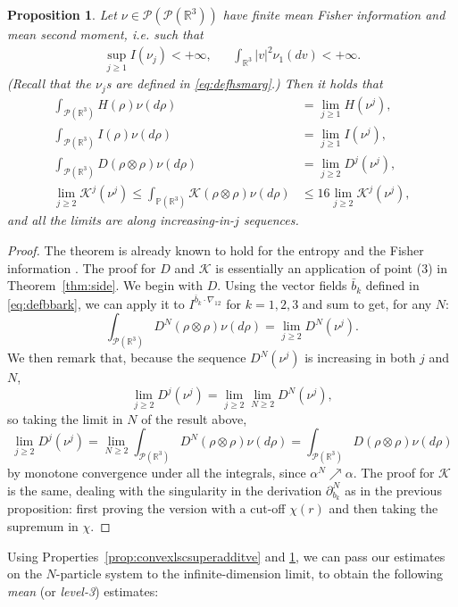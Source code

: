 \documentclass[11pt,a4paper]{article}
\theoremstyle{definition}
\theoremstyle{plain}
\newtheorem{prop}[defi]{Proposition}
\begin{document}
\begin{prop}
    \label{thm:level3affinity}
    Let $\nu\in \mathcal{P}(\mathcal{P}(\mathbb{R}^3))$ have finite mean Fisher information and mean second moment, \textit{i.e.} such that
    \begin{align*}
        \sup_{j\geq 1} I(\nu_j) < +\infty,&&\int_{\mathbb{R}^3} \vert v \vert^2 \nu_1(dv) < +\infty.
    \end{align*}
    (Recall that the $\nu_j$s are defined in \eqref{eq:defhsmarg}.) Then it holds that
    \begin{align*}
        \int_{\mathcal{P}(\mathbb{R}^3)} H(\rho) \nu(d\rho) &=\lim_{j\geq 1} H(\nu^j),\\
        \int_{\mathcal{P}(\mathbb{R}^3)} I(\rho) \nu(d\rho) &=\lim_{j\geq 1} I(\nu^j),\\
        \int_{\mathcal{P}(\mathbb{R}^3)} D(\rho \otimes \rho) \nu(d\rho) &=\lim_{j\geq 2} D^j(\nu^j),\\
        \lim_{j\geq 2} \mathcal{K}^j(\nu^j)\leq \int_{\mathbb{P}(\mathbb{R}^3)} \mathcal{K}(\rho \otimes \rho) \nu(d\rho) &\leq 16 \lim_{j\geq 2} \mathcal{K}^j(\nu^j), 
    \end{align*}
    and all the limits are along increasing-in-$j$ sequences.
\end{prop}
\begin{proof}
    The theorem is already known to hold for the entropy \cite{RobinsonRuelle1967} and the Fisher information \cite{HaurayMischler2012,Rougerie2020}. The proof for $D$ and $\mathcal{K}$ is essentially an application of point (3) in Theorem~\ref{thm:side}. We begin with $D$. Using the vector fields $\bar{b}_k$ defined in \eqref{eq:defbbark}, we can apply it to $I^{\bar{b}_k\cdot\nabla_{12}}$ for $k=1,2,3$ and sum to get, for any $N$:
    $$\int_{\mathcal{P}(\mathbb{R}^3)} D^N(\rho \otimes \rho) \nu(d\rho) =\lim_{j\geq 2} D^N(\nu^j).$$
    We then remark that, because the sequence $D^N(\nu^j)$ is increasing in both $j$ and $N$,
    $$\lim_{j\geq 2} D^j(\nu^j)=\lim_{j\geq 2}\lim_{N\geq 2} D^N(\nu^j),$$
    so taking the limit in $N$ of the result above,
    $$\lim_{j\geq 2} D^j(\nu^j)=\lim_{N\geq 2}\int_{\mathcal{P}(\mathbb{R}^3)} D^N(\rho \otimes \rho) \nu(d\rho)=\int_{\mathcal{P}(\mathbb{R}^3)} D(\rho \otimes \rho) \nu(d\rho)$$
    by monotone convergence under all the integrals, since $\alpha^N \nearrow \alpha$. The proof for $\mathcal{K}$ is the same, dealing with the singularity in the derivation $\partial^N_{b_k}$ as in the previous proposition: first proving the version with a cut-off $\chi(r)$ and then taking the supremum in $\chi$.
\end{proof}
Using Properties~\ref{prop:convexlscsuperadditve} and \ref{thm:level3affinity}, we can pass our estimates on the $N$-particle system to the infinite-dimension limit, to obtain the following \textit{mean} (or \textit{level-3}) estimates:
\end{document}
